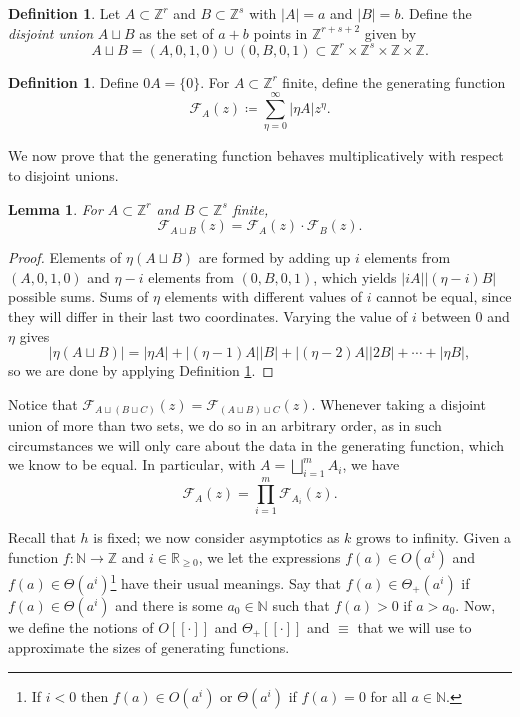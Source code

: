 \documentclass{daj}
\newtheorem{lemma}[theorem]{Lemma}
\theoremstyle{definition}
\newtheorem{definition}[theorem]{Definition}
\theoremstyle{remark}
\numberwithin{equation}{section}
\numberwithin{theorem}{section}
\newcommand{\N}{\mathbb{N}}
\newcommand{\R}{\mathbb{R}}
\newcommand{\Z}{\mathbb{Z}}
\newcommand{\calf}{\mathcal{F}}
\begin{document}
\begin{definition}\label{defDisjointUnion}
    Let $A \subset \Z^r$ and $B \subset \Z^s$ with $|A| = a$ and $|B| = b$. Define the \emph{disjoint union} $A \sqcup B$ as the set of $a+b$ points in $\Z^{r+s+2}$ given by \[A \sqcup B = (A,0,1,0) \cup (0,B,0,1) \subset \Z^r \times \Z^s \times \Z \times \Z.\]
\end{definition}

\begin{definition}\label{defGenFunc}
    Define $0A = \{0\}$. For $A \subset \Z^r$ finite, define the generating function \[\mathcal{F}_A(z) \coloneq \sum_{\eta=0}^{\infty} |\eta A|z^\eta.\]
\end{definition}
We now prove that the generating function behaves multiplicatively with respect to disjoint unions.

\begin{lemma}\label{lemmagenfunc} For $A \subset \Z^r$ and $B\subset \Z^s$ finite,
    \[\mathcal{F}_{A \sqcup B}(z) = \mathcal{F}_A(z) \cdot \mathcal{F}_B(z).\]
\end{lemma}
\begin{proof}
    Elements of $\eta (A \sqcup B)$ are formed by adding up $i$ elements from $(A,0,1,0)$ and $\eta -i$ elements from $(0,B,0,1)$, which yields $|iA||(\eta -i)B|$ possible sums. Sums of $\eta$ elements with different values of $i$ cannot be equal, since they will differ in their last two coordinates. Varying the value of $i$ between $0$ and $\eta $ gives \[|\eta (A \sqcup B)| = |\eta A|+|(\eta -1)A||B| + |(\eta -2)A||2B|+\cdots+|\eta B|,\] so we are done by applying Definition \ref{defGenFunc}.
\end{proof}

Notice that $\calf_{A \sqcup(B \sqcup C)}(z) = \calf_{(A \sqcup B)\sqcup C}(z)$. Whenever taking a disjoint union of more than two sets, we do so in an arbitrary order, as in such circumstances we will only care about the data in the generating function, which we know to be equal. In particular, with $A = \displaystyle\bigsqcup_{i=1}^m {A_{i}}$, we have \[\calf_A(z) = \prod_{i=1}^m \calf_{A_{i}}(z).\]

Recall that $h$ is fixed; we now consider asymptotics as $k$ grows to infinity. Given a function $f: \N \to \Z$ and $i \in \R_{\geq 0}$, we let the expressions $f(a) \in O(a^i)$ and $f(a) \in \Theta(a^i)$\footnote{If $i <0$ then $f(a) \in O(a^i)$ or $\Theta(a^i)$ if $f(a) = 0$ for all $a \in \N$.} have their usual meanings. Say that $f(a) \in \Theta_+(a^i)$ if $f(a) \in \Theta(a^i)$ and there is some $a_0 \in \N$ such that $f(a) > 0$ if $a > a_0$. 
 Now, we define the notions of $O[[\cdot]]$ and $\Theta_+[[\cdot]]$ and $\equiv$ that we will use to approximate the sizes of generating functions.
\end{document}
